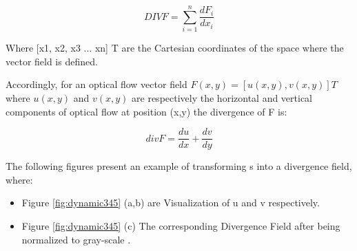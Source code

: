 \begin{dBox}
\begin{equation}
DIVF = \sum_{i=1}^{n}\frac{d F_i}{d x_i}
\end{equation}
\end{dBox}

Where [x1, x2, x3 ... xn] T are the Cartesian coordinates of the space where the vector field is defined.\bigskip

Accordingly, for an optical flow vector field $F(x,y) = [u(x,y), v(x,y)]T$ where $u(x,y)$ and $v(x,y)$ are respectively the horizontal and vertical components of optical flow at position (x,y) the divergence of F is:

\begin{dBox}
\begin{equation}
divF = \frac{du}{dx} + \frac{dv}{dy}
\end{equation}
\end{dBox}
\bigskip

The following figures present an example of transforming s into a divergence field, where:

\begin{itemize}
\item Figure \ref{fig:dynamic345} (a,b) are Visualization of u and v respectively. 

\item Figure \ref{fig:dynamic345} (c) The corresponding Divergence Field after being normalized to gray-scale \cite{dynamic2}.

\end{itemize}


